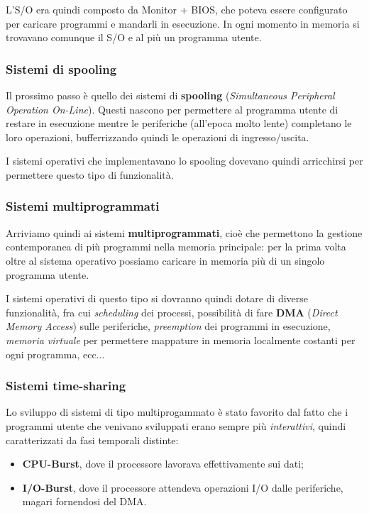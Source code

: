 \documentclass[a4paper,11pt]{article}
\begin{document}
L'S/O era quindi composto da Monitor + BIOS, che poteva essere configurato per caricare programmi e mandarli in esecuzione.
In ogni momento in memoria si trovavano comunque il S/O e al più un programma utente.

\subsubsection{Sistemi di spooling}
Il prossimo passo è quello dei sistemi di \textbf{spooling} (\textit{Simultaneous Peripheral Operation On-Line}).
Questi nascono per permettere al programma utente di restare in esecuzione mentre le periferiche (all'epoca molto lente) completano le loro operazioni, bufferrizzando quindi le operazioni di ingresso/uscita.

I sistemi operativi che implementavano lo spooling dovevano quindi arricchirsi per permettere questo tipo di funzionalità.

\subsubsection{Sistemi multiprogrammati}
Arriviamo quindi ai sistemi \textbf{multiprogrammati}, cioè che permettono la gestione contemporanea di più programmi nella memoria principale: per la prima volta oltre al sistema operativo possiamo caricare in memoria più di un singolo programma utente.

I sistemi operativi di questo tipo si dovranno quindi dotare di diverse funzionalità, fra cui \textit{scheduling} dei processi, possibilità di fare \textbf{DMA} (\textit{Direct Memory Access}) sulle periferiche, \textit{preemption} dei programmi in esecuzione, \textit{memoria virtuale} per permettere mappature in memoria localmente costanti per ogni programma, ecc...

\subsubsection{Sistemi time-sharing}
Lo sviluppo di sistemi di tipo multiprogammato è stato favorito dal fatto che i programmi utente che venivano sviluppati erano sempre più \textit{interattivi}, quindi caratterizzati da fasi temporali distinte:
\begin{itemize}
	\item \textbf{CPU-Burst}, dove il processore lavorava effettivamente sui dati;
	\item \textbf{I/O-Burst}, dove il processore attendeva operazioni I/O dalle periferiche, magari fornendosi del DMA.
\end{itemize}
\end{document}
